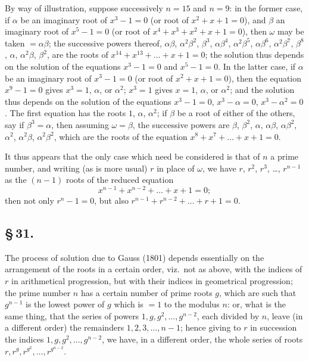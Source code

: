 \documentclass[11pt,a4paper]{article}
\begin{document}
By way of illustration, suppose successively $n = 15$ and $n = 9$: in the former case, if $\alpha$ be an imaginary root of $x^{3} - 1 = 0$ (or root of $x^{2} + x + 1 = 0$), and $\beta$ an imaginary root of $x^{5} - 1 = 0$ (or root of $x^{4} + x^{3} + x^{2} + x + 1 = 0$), then $\omega$ may be taken $= \alpha\beta$; the successive powers thereof, $\alpha\beta$, $\alpha^{2}\beta^{2}$, $\beta^{3}$, $\alpha\beta^{4}$, $\alpha^{2}\beta^{5}$, $\alpha\beta^{6}$, $\alpha^{2}\beta^{7}$, $\beta^{8}$, $\alpha$, $\alpha^{2}\beta$, $\beta^{2}$, are the roots of $x^{14} + x^{13} + \ldots + x + 1 = 0$; the solution thus depends on the solution of the equations $x^{3} - 1 = 0$ and $x^{5} - 1 = 0$. In the latter case, if $\alpha$ be an imaginary root of $x^{3} - 1 = 0$ (or root of $x^{2} + x + 1 = 0$), then the equation $x^{9} - 1 = 0$ gives $x^{3} = 1$, $\alpha$, or $\alpha^{2}$; $x^{3} = 1$ gives $x = 1$, $\alpha$, or $\alpha^{2}$; and the solution thus depends on the solution of the equations $x^{3} - 1 = 0$, $x^{3} - \alpha = 0$, $x^{3} - \alpha^{2} = 0$. The first equation has the roots $1$, $\alpha$, $\alpha^{2}$; if $\beta$ be a root of either of the others, say if $\beta^{3} = \alpha$, then assuming $\omega = \beta$, the successive powers are $\beta$, $\beta^{2}$, $\alpha$, $\alpha\beta$, $\alpha\beta^{2}$, $\alpha^{2}$, $\alpha^{2}\beta$, $\alpha^{2}\beta^{2}$, which are the roots of the equation $x^{8} + x^{7} + \ldots + x + 1 = 0$.

It thus appears that the only case which need be considered is that of $n$ a prime number, and writing (as is more usual) $r$ in place of $\omega$, we have $r$, $r^{2}$, $r^{3}$, \ldots, $r^{n-1}$ as the $(n - 1)$ roots of the reduced equation
\[
x^{n-1} + x^{n-2} + \ldots + x + 1 = 0;
\]
then not only $r^{n} - 1 = 0$, but also $r^{n-1} + r^{n-2} + \ldots + r + 1 = 0$.

\subsection*{\S\,31.}

The process of solution due to Gauss (1801) depends essentially on the arrangement of the roots in a certain order, viz.\ not as above, with the indices of $r$ in arithmetical progression, but with their indices in geometrical progression; the prime number $n$ has a certain number of prime roots $g$, which are such that $g^{n-1}$ is the lowest power of $g$ which is $= 1$ to the modulus $n$: or, what is the same thing, that the series of powers $1, g, g^{2}, \ldots, g^{n-2}$, each divided by $n$, leave (in a different order) the remainders $1, 2, 3, \ldots, n - 1$; hence giving to $r$ in succession the indices $1, g, g^{2}, \ldots, g^{n-2}$, we have, in a different order, the whole series of roots $r, r^{g}, r^{g^{2}}, \ldots, r^{g^{n-2}}$.
\end{document}
